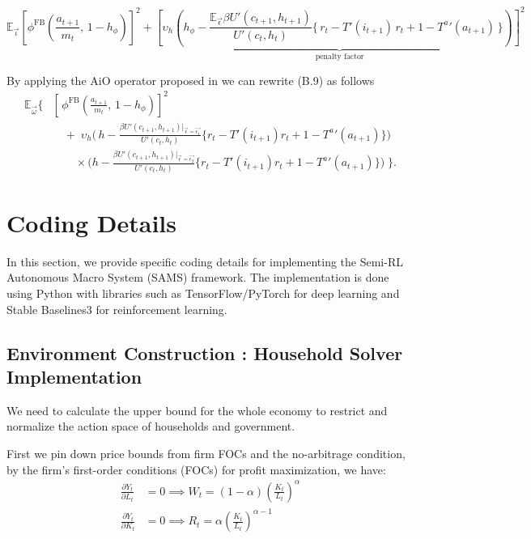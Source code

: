 \documentclass[11pt]{article}
\begin{document}
\begin{equation}
  \mathbb{E}_{\vec{\iota}}\left[\phi^{\text{FB}}\!\left(
  \frac{a_{t+1}}{m_t},\,
  1 - h_{\phi}
  \right) \right]^2 + 
  \underbrace{\left[ \upsilon_h\!\left(h_{\phi} - \frac{\mathbb{E}_{\vec{\epsilon}} \beta U'(c_{t+1},h_{t+1})}{U'(c_t,h_t)}\Big\{\, r_t - T'(i_{t+1})\,r_t + 1 - {T^a}'(a_{t+1}) \,\Big\}\right) \right]^2}_{\text{penalty factor}}
\end{equation}

By applying the AiO operator proposed in \cite{maliar2021deep} we can rewrite (B.9) as follows
\label{objfunc:AiO}
\begin{equation}
\begin{aligned}
\mathbb{E}_{\vec{\omega}} \Big\{ &
    \left[\,
      \phi^{\text{FB}}\!\left(
        \tfrac{a_{t+1}}{m_t},\,
        1 - h_{\phi}
      \right)
    \right]^2
    \\
    &\quad +\;
    \upsilon_h \Bigg(
      \,h - 
      \frac{\beta U'(c_{t+1},h_{t+1})|_{\vec{\epsilon}=\vec{\epsilon_1}}}
           {U'(c_t,h_t)}
      \Big\{ r_t - T'(i_{t+1}) r_t + 1 - {T^a}'(a_{t+1}) \Big\}
    \Bigg)
    \\
    &\qquad \times
    \Bigg(
      h - 
      \frac{\beta U'(c_{t+1},h_{t+1})|_{\vec{\epsilon}=\vec{\epsilon_2}}}
           {U'(c_t,h_t)}
      \Big\{ r_t - T'(i_{t+1}) r_t + 1 - {T^a}'(a_{t+1}) \Big\}
    \Bigg)
\;\Big\}.
\end{aligned}
\end{equation}


\section{Coding Details}

In this section, we provide specific coding details for implementing the Semi-RL Autonomous Macro System (SAMS) framework. The implementation is done using Python with libraries such as TensorFlow/PyTorch for deep learning and Stable Baselines3 for reinforcement learning.

\subsection{Environment Construction : Household Solver Implementation}

We need to calculate the upper bound for the whole economy to restrict and normalize the action space of households and government.

First we pin down price bounds from firm FOCs and the no-arbitrage condition, by the firm's first-order conditions (FOCs) for profit maximization, we have:
\begin{equation}
\begin{aligned}
\frac{\partial Y_t}{\partial L_t} &= 0 \implies W_t = (1 - \alpha) \left( \frac{K_t}{L_t} \right)^{\alpha} \\
\frac{\partial Y_t}{\partial K_t} &= 0 \implies R_t = \alpha \left( \frac{K_t}{L_t} \right)^{\alpha - 1}
\end{aligned}
\end{equation}
\end{document}
